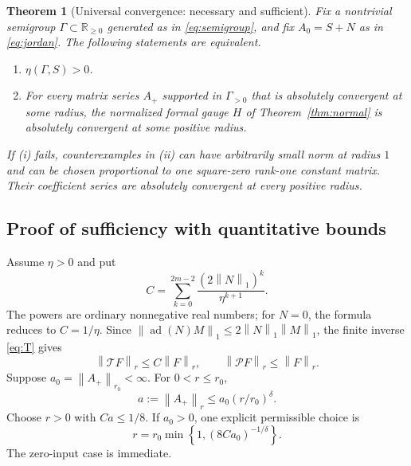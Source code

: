 \documentclass[11pt,a4paper]{article}
\numberwithin{equation}{section}
\newtheorem{theorem}{Theorem}[section]
\theoremstyle{definition}
\theoremstyle{remark}
\newcommand{\R}{\mathbb R}
\newcommand{\G}{\Gamma}
\newcommand{\ad}{\operatorname{ad}}
\newcommand{\norm}[1]{\left\lVert #1\right\rVert}
\newcommand{\Aplus}{A_{+}}
\newcommand{\Ph}{\mathcal P}
\newcommand{\Th}{\mathcal T}
\begin{document}
\begin{theorem}[Universal convergence: necessary and sufficient]
\label{thm:universal}
Fix a nontrivial semigroup $\G\subset\R_{\geq0}$ generated as in
\eqref{eq:semigroup}, and fix $A_0=S+N$ as in \eqref{eq:jordan}. The
following statements are equivalent.
\begin{enumerate}[label=\textup{(\roman*)}]
\item $\eta(\G,S)>0$.
\item For every matrix series $\Aplus$ supported in $\G_{>0}$ that is
absolutely convergent at some radius, the normalized formal gauge $H$ of
Theorem~\ref{thm:normal} is absolutely convergent at some positive radius.
\end{enumerate}
If \textup{(i)} fails, counterexamples in \textup{(ii)} can have arbitrarily
small norm at radius $1$ and can be chosen proportional to one square-zero
rank-one constant matrix. Their coefficient series are absolutely
convergent at every positive radius.
\end{theorem}

\subsection{Proof of sufficiency with quantitative bounds}
Assume $\eta>0$ and put
\begin{equation}\label{eq:C}
 C=\sum_{k=0}^{2m-2}\frac{(2\norm N_1)^k}{\eta^{k+1}}.
\end{equation}
The powers are ordinary nonnegative real numbers; for $N=0$, the formula
reduces to $C=1/\eta$. Since
$\norm{\ad(N)M}_1\leq2\norm N_1\norm M_1$, the finite inverse
\eqref{eq:T} gives
\begin{equation}\label{eq:operator-bounds}
 \norm{\Th F}_r\leq C\norm F_r,\qquad
 \norm{\Ph F}_r\leq\norm F_r.
\end{equation}
Suppose $a_0=\norm{\Aplus}_{r_0}<\infty$. For $0<r\leq r_0$,
\begin{equation}\label{eq:radius-decay}
 a:=\norm{\Aplus}_r\leq a_0(r/r_0)^\delta.
\end{equation}
Choose $r>0$ with $Ca\leq1/8$. If $a_0>0$, one explicit permissible
choice is
\begin{equation}\label{eq:explicit-radius}
 r=r_0\min\left\{1,(8Ca_0)^{-1/\delta}\right\}.
\end{equation}
The zero-input case is immediate.
\end{document}
